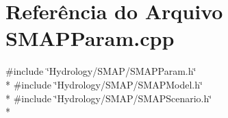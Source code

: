 \section{Referência do Arquivo S\+M\+A\+P\+Param.\+cpp}
\label{_s_m_a_p_param_8cpp}
{\ttfamily \#include \char`\"{}Hydrology/\+S\+M\+A\+P/\+S\+M\+A\+P\+Param.\+h\char`\"{}}\\*
{\ttfamily \#include \char`\"{}Hydrology/\+S\+M\+A\+P/\+S\+M\+A\+P\+Model.\+h\char`\"{}}\\*
{\ttfamily \#include \char`\"{}Hydrology/\+S\+M\+A\+P/\+S\+M\+A\+P\+Scenario.\+h\char`\"{}}\\*
